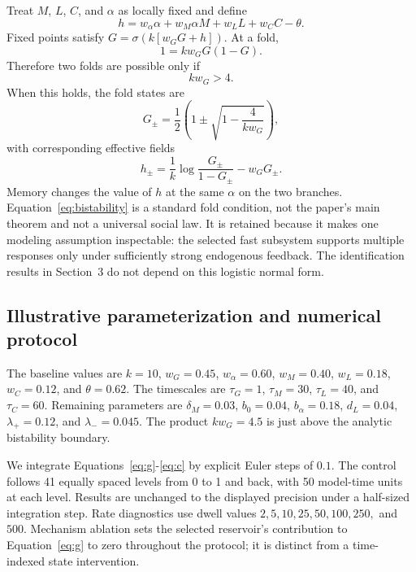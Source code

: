 \documentclass[pdflatex,sn-mathphys-num]{sn-jnl}
\begin{document}
Treat $M$, $L$, $C$, and $\alpha$ as locally fixed and define
\begin{equation}
h=w_\alpha\alpha+w_M\alpha M+w_LL+w_CC-\theta.
\end{equation}
Fixed points satisfy $G=\sigma(k[w_GG+h])$. At a fold,
\begin{equation}
1=k w_G G(1-G).
\end{equation}
Therefore two folds are possible only if
\begin{equation}
k w_G>4. \label{eq:bistability}
\end{equation}
When this holds, the fold states are
\begin{equation}
G_{\pm}=\frac{1}{2}\left(1\pm\sqrt{1-\frac{4}{k w_G}}\right),
\end{equation}
with corresponding effective fields
\begin{equation}
h_{\pm}=\frac{1}{k}\log\frac{G_{\pm}}{1-G_{\pm}}-w_GG_{\pm}.
\end{equation}
Memory changes the value of $h$ at the same $\alpha$ on the two branches. Equation~\eqref{eq:bistability} is a standard fold condition, not the paper's main theorem and not a universal social law. It is retained because it makes one modeling assumption inspectable: the selected fast subsystem supports multiple responses only under sufficiently strong endogenous feedback. The identification results in Section~3 do not depend on this logistic normal form.

\subsection{Illustrative parameterization and numerical protocol}

The baseline values are $k=10$, $w_G=0.45$, $w_\alpha=0.60$, $w_M=0.40$, $w_L=0.18$, $w_C=0.12$, and $\theta=0.62$. The timescales are $\tau_G=1$, $\tau_M=30$, $\tau_L=40$, and $\tau_C=60$. Remaining parameters are $\delta_M=0.03$, $b_0=0.04$, $b_\alpha=0.18$, $d_L=0.04$, $\lambda_+=0.12$, and $\lambda_-=0.045$. The product $k w_G=4.5$ is just above the analytic bistability boundary.

We integrate Equations~\eqref{eq:g}-\eqref{eq:c} by explicit Euler steps of $0.1$. The control follows 41 equally spaced levels from 0 to 1 and back, with 50 model-time units at each level. Results are unchanged to the displayed precision under a half-sized integration step. Rate diagnostics use dwell values $2,5,10,25,50,100,250,$ and $500$. Mechanism ablation sets the selected reservoir's contribution to Equation~\eqref{eq:g} to zero throughout the protocol; it is distinct from a time-indexed state intervention.
\end{document}

